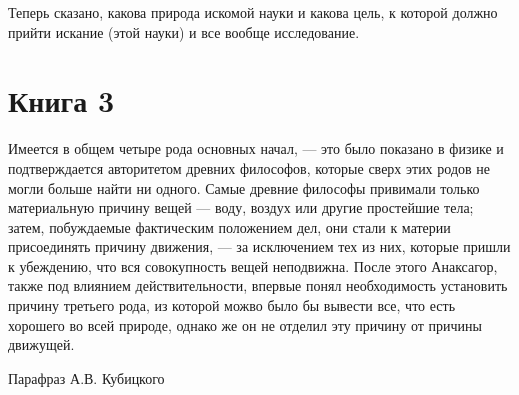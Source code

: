 \documentclass[oneside, 17pt, dvipsnames]{extbook}
\begin{document}
Теперь сказано, какова природа искомой науки и какова цель, к которой должно прийти искание (этой науки) и все вообще исследование.





\newpage
\section{Книга 3}

\epigraph{
Имеется в общем четыре рода основных начал, --- это было показано в физике и подтверждается авторитетом древних философов, которые сверх этих родов не могли больше найти ни одного. Самые древние философы привимали только материальную причину вещей --- воду, воздух или другие простейшие тела; затем, побуждаемые фактическим положением дел, они стали к материи присоединять причину движения, --- за исключением тех из них, которые пришли к убеждению, что вся совокупность вещей неподвижна. После этого Анаксагор, также под влиянием действительности, впервые понял необходимость установить причину третьего рода, из которой можво было бы вывести все, что есть хорошего во всей природе, однако же он не отделил эту причину от причины движущей.
}{Парафраз А.В. Кубицкого}
\end{document}
